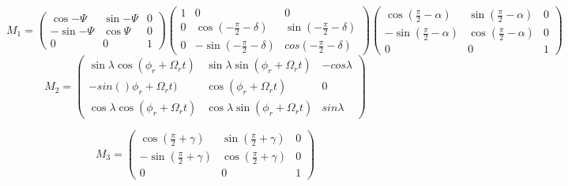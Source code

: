 \documentclass{ttuthes2007}
\begin{document}
\begin{equation}
M_1=
\begin{pmatrix}
\cos{-\Psi} & \sin{-\Psi}& 0\\
-\sin{-\Psi} & \cos{\Psi}& 0\\
0 & 0 & 1
\end{pmatrix}
\begin{pmatrix}
1 & 0 & 0\\
0 & \cos{(-\frac{\pi}{2}-\delta)} & \sin{(-\frac{\pi}{2}-\delta)}\\
0 & -\sin{(-\frac{\pi}{2}-\delta)} & cos{(-\frac{\pi}{2}-\delta)}
\end{pmatrix}
\begin{pmatrix}
\cos{(\frac{\pi}{2}-\alpha)} & \sin{(\frac{\pi}{2}-\alpha)} & 0\\
-\sin{(\frac{\pi}{2}-\alpha)} & \cos{(\frac{\pi}{2}-\alpha)} & 0\\
0 & 0 & 1 
\end{pmatrix}
\end{equation}
\begin{equation}
M_2=
\begin{pmatrix}
\sin{\lambda}\cos{(\phi_r+\Omega_rt)} & \sin{\lambda}\sin{(\phi_r+\Omega_rt)} 
& -cos{\lambda}\\
-sin{()\phi_r+\Omega_rt)} & \cos{(\phi_r+\Omega_rt)} & 0\\
\cos{\lambda}\cos{(\phi_r+\Omega_rt)}  & \cos{\lambda}\sin{(\phi_r+\Omega_rt)} 
& sin{\lambda}
\end{pmatrix}
\end{equation}

\begin{equation}
M_3=
\begin{pmatrix}
\cos{(\frac{\pi}{2}+\gamma)} & \sin{(\frac{\pi}{2}+\gamma)} & 0\\
-\sin{(\frac{\pi}{2}+\gamma)} & \cos{(\frac{\pi}{2}+\gamma)} & 0\\
0 & 0 & 1
\end{pmatrix}
\end{equation}
\end{document}
